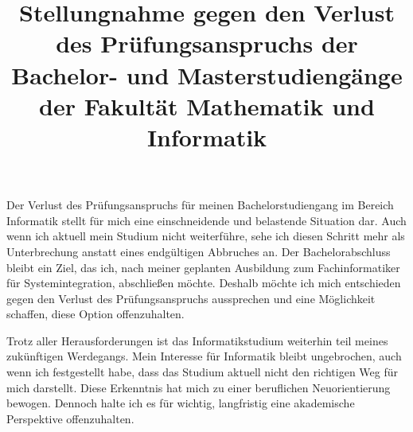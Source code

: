 \documentclass[a4paper,12pt]{article}
\title{Stellungnahme gegen den Verlust des Prüfungsanspruchs der Bachelor- und Masterstudiengänge der Fakultät Mathematik und Informatik}
\author{}
\date{}
\begin{document}
\maketitle

Der Verlust des Prüfungsanspruchs für meinen Bachelorstudiengang im Bereich Informatik stellt für mich eine einschneidende und belastende Situation dar.
Auch wenn ich aktuell mein Studium nicht weiterführe, sehe ich diesen Schritt mehr als Unterbrechung anstatt eines endgültigen Abbruches an.
Der Bachelorabschluss bleibt ein Ziel, das ich, nach meiner geplanten Ausbildung zum Fachinformatiker für Systemintegration, abschließen möchte.
Deshalb möchte ich mich entschieden gegen den Verlust des Prüfungsanspruchs aussprechen und eine Möglichkeit schaffen, diese Option offenzuhalten.

Trotz aller Herausforderungen ist das Informatikstudium weiterhin teil meines zukünftigen Werdegangs.
Mein Interesse für Informatik bleibt ungebrochen, auch wenn ich festgestellt habe, dass das Studium aktuell nicht den richtigen Weg für mich darstellt.
Diese Erkenntnis hat mich zu einer beruflichen Neuorientierung bewogen.
Dennoch halte ich es für wichtig, langfristig eine akademische Perspektive offenzuhalten.
\\
\end{document}
